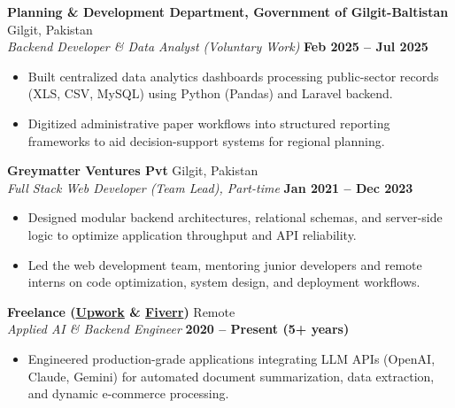 \documentclass[a4paper,10pt]{article}
\begin{document}
\vspace{6pt}

\noindent \textbf{Planning \& Development Department, Government of Gilgit-Baltistan} \hfill Gilgit, Pakistan \\
\textit{Backend Developer \& Data Analyst (Voluntary Work)} \hfill \textbf{Feb 2025 -- Jul 2025}
\begin{itemize}
    \item Built centralized data analytics dashboards processing public-sector records (XLS, CSV, MySQL) using Python (Pandas) and Laravel backend.
    \item Digitized administrative paper workflows into structured reporting frameworks to aid decision-support systems for regional planning.
\end{itemize}

\vspace{6pt}

\noindent \textbf{Greymatter Ventures Pvt} \hfill Gilgit, Pakistan \\
\textit{Full Stack Web Developer (Team Lead), Part-time} \hfill \textbf{Jan 2021 -- Dec 2023}
\begin{itemize}
    \item Designed modular backend architectures, relational schemas, and server-side logic to optimize application throughput and API reliability.
    \item Led the web development team, mentoring junior developers and remote interns on code optimization, system design, and deployment workflows.
\end{itemize}

\vspace{6pt}

\noindent \textbf{Freelance (\href{https://www.upwork.com/freelancers/~01f763ee3322eda908}{Upwork} \& \href{https://fiverr.com/aliyanfaisal/}{Fiverr})} \hfill Remote \\
\textit{Applied AI \& Backend Engineer} \hfill \textbf{2020 -- Present (5+ years)}
\begin{itemize}
    \item Engineered production-grade applications integrating LLM APIs (OpenAI, Claude, Gemini) for automated document summarization, data extraction, and dynamic e-commerce processing.
\end{itemize}

\end{document}
